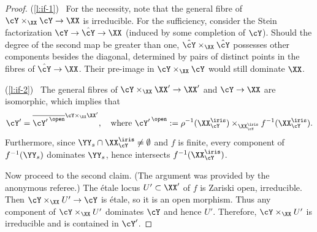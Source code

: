 \begin{proof} 
(\ref{l:if-1})~ For the necessity, note that the general fibre of $\cY\times_\XX\cY\to\XX$ is irreducible. For the sufficiency, consider the Stein factorization $\cY\to\hat\cY\to\XX$ (induced by some completion of $\cY$). Should the degree of the second map be greater than one, $\hat\cY\times_\XX\hat\cY$ possesses other components besides the diagonal, determined by pairs of distinct points in the fibres of $\hat\cY\to\XX$. Their pre-image in $\cY\times_\XX\cY$ would still dominate $\XX$.

(\ref{l:if-2})~ The general fibres of $\cY\times_\XX\XX'\to\XX'$ and $\cY\to\XX$ are isomorphic, which implies that 
\[
\cY'=\overline{{\cY'}^{\,\open}}^{\cY\times_\XX\XX'},\quad\text{where } {\cY'}^{\,\open}:=\rho^{-1}(\XX^\iris_\cY)\times_{\XX^\iris_\cY}f^{-1}(\XX^\iris_\cY).
\]
Furthermore, since $\YY_s\cap\XX^\iris_\cY\neq\emptyset$ and $f$ is finite, every component of $f^{-1}(\YY_s)$ dominates $\YY_s$, hence intersects $f^{-1}(\XX^\iris_\cY)$. 

Now proceed to the second claim. (The argument was provided by the anonymous referee.) The \'etale locus $U'\subset\XX'$ of $f$ is Zariski open, irreducible. Then $\cY\times_\XX U'\to \cY$ is \'etale, so it is an open morphism. Thus any component of $\cY\times_\XX U'$ dominates $\cY$ and hence $U'$. Therefore, $\cY\times_\XX U'$ is irreducible and is contained in $\cY'$.  
\end{proof}






































































